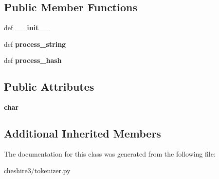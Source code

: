 \subsection*{Public Member Functions}
\begin{DoxyCompactItemize}
\item 
\hypertarget{classcheshire3_1_1tokenizer_1_1_simple_tokenizer_a5584a019dcaa3ecf06ce85dac43ea580}{def {\bfseries \-\_\-\-\_\-init\-\_\-\-\_\-}}\label{classcheshire3_1_1tokenizer_1_1_simple_tokenizer_a5584a019dcaa3ecf06ce85dac43ea580}

\item 
\hypertarget{classcheshire3_1_1tokenizer_1_1_simple_tokenizer_a96f585c45e3b6da01dde6cc3cd299a53}{def {\bfseries process\-\_\-string}}\label{classcheshire3_1_1tokenizer_1_1_simple_tokenizer_a96f585c45e3b6da01dde6cc3cd299a53}

\item 
\hypertarget{classcheshire3_1_1tokenizer_1_1_simple_tokenizer_ace98d0276efab05a33c4238338487467}{def {\bfseries process\-\_\-hash}}\label{classcheshire3_1_1tokenizer_1_1_simple_tokenizer_ace98d0276efab05a33c4238338487467}

\end{DoxyCompactItemize}
\subsection*{Public Attributes}
\begin{DoxyCompactItemize}
\item 
\hypertarget{classcheshire3_1_1tokenizer_1_1_simple_tokenizer_a36185c8625eda89736352d7067b54624}{{\bfseries char}}\label{classcheshire3_1_1tokenizer_1_1_simple_tokenizer_a36185c8625eda89736352d7067b54624}

\end{DoxyCompactItemize}
\subsection*{Additional Inherited Members}


The documentation for this class was generated from the following file\-:\begin{DoxyCompactItemize}
\item 
cheshire3/tokenizer.\-py\end{DoxyCompactItemize}
